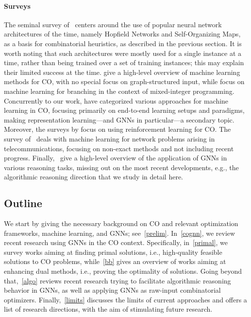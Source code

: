 \documentclass[twoside,11pt]{article}
\begin{document}
\paragraph{Surveys} The seminal survey of~\citet{smith1999neural} centers around the use of popular neural network architectures of the time, namely Hopfield Networks and Self-Organizing Maps, as a basis for combinatorial heuristics, as described in the previous section. It is worth noting that such architectures were mostly used for a single instance at a time, rather than being trained over a set of training instances; this may explain their limited success at the time. \citet{Bengio2018} give a high-level overview of machine learning methods for CO, with no special focus on graph-structured input, while \citet{Lod+2017} focus on machine learning for branching in the context of mixed-integer programming. Concurrently to our work, \citet{kotary2021end} have categorized various approaches for machine learning in CO, focusing primarily on end-to-end learning setups and paradigms, making representation learning---and GNNs in particular---a secondary topic. Moreover, the surveys by \cite{Maz+2020,Yan+2020} focus on using reinforcement learning for CO. The survey of~\cite{Ves+2020} deals with machine learning for network problems arising in telecommunications, focusing on non-exact methods and not including recent progress. Finally,~\cite{Lam+2020} give a high-level overview of the application of GNNs in various reasoning tasks, missing out on the most recent developments, e.g., the algorithmic reasoning direction that we study in detail here.

\subsection{Outline}
We start by giving the necessary background on CO and relevant optimization frameworks, machine learning, and GNNs; see~\cref{prelim}. In~\cref{cognn}, we review recent research using GNNs in the CO context. Specifically, in~\cref{primal}, we survey works aiming at finding primal solutions, i.e., high-quality feasible solutions to CO problems, while~\cref{bb} gives an overview of works aiming at enhancing dual methods, i.e., proving the optimality of solutions. Going beyond that,~\cref{algo} reviews recent research trying to facilitate algorithmic reasoning behavior in GNNs, as well as applying GNNs as raw-input combinatorial optimizers. Finally,~\cref{limits} discusses the limits of current approaches and offers a list of research directions, with the aim of stimulating future research.
\end{document}
